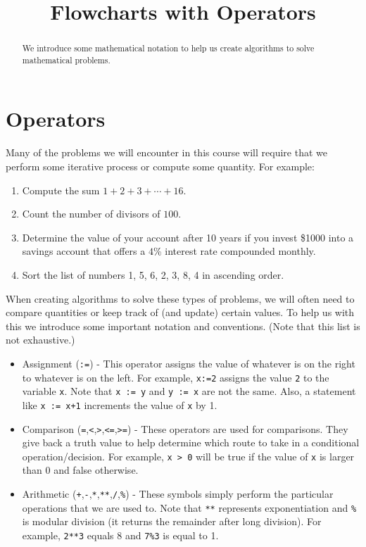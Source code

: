 \documentclass{ximera}
\title{Flowcharts with Operators}
\begin{document}
\begin{abstract}
We introduce some mathematical notation to help us create algorithms to solve mathematical problems.
\end{abstract}
\maketitle

\section{Operators}
Many of the problems we will encounter in this course will require that we perform some iterative process or compute some quantity. For example:

\begin{enumerate}
	\item Compute the sum $1+2+3+\cdots+16$.
	\item Count the number of divisors of $100$.
	\item Determine the value of your account after 10 years if you invest \$1000 into a savings account that offers a $4$\% interest rate compounded monthly.
	\item Sort the list of numbers 1, 5, 6, 2, 3, 8, 4 in ascending order.
\end{enumerate}

When creating algorithms to solve these types of problems, we will often need to compare quantities or keep track of (and update) certain values. To help us with this we introduce some important notation and conventions. (Note that this list is not exhaustive.)

\begin{itemize}
	\item Assignment (\verb|:=|) - This operator assigns the value of whatever is on the right to whatever is on the left. For example, \verb|x:=2| assigns the value \verb|2| to the variable \verb|x|. Note that \verb|x := y| and \verb|y := x| are not the same. Also, a statement like \verb|x := x+1| increments the value of \verb|x| by 1.
	\item Comparison (\verb|=|,\verb|<|,\verb|>|,\verb|<=|,\verb|>=|) - These operators are used for comparisons. They give back a truth value to help determine which route to take in a conditional operation/decision. For example, \verb|x > 0| will be true if the value of \verb|x| is larger than 0 and false otherwise.
		\item Arithmetic (\verb|+|,\verb|-|,\verb|*|,\verb|**|,\verb|/|,\verb|%|) - These symbols simply perform the particular operations that we are used to. Note that \verb|**| represents exponentiation and \verb|%| is modular division (it returns the remainder after long division). For example, \verb|2**3| equals 8 and \verb|7%3| is equal to 1.
\end{itemize}
\end{document}
